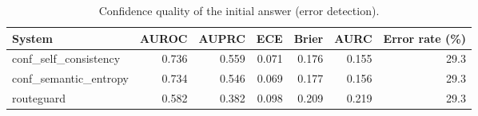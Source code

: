 \begin{table}[t]
\centering
\small
\caption{Confidence quality of the initial answer (error detection).}
\label{tab:calibration}
\begin{tabular}{lrrrrrr}
\toprule
System & AUROC & AUPRC & ECE & Brier & AURC & Error rate (\%) \\
\midrule
conf\_self\_consistency & 0.736 & 0.559 & 0.071 & 0.176 & 0.155 & 29.3 \\
conf\_semantic\_entropy & 0.734 & 0.546 & 0.069 & 0.177 & 0.156 & 29.3 \\
routeguard & 0.582 & 0.382 & 0.098 & 0.209 & 0.219 & 29.3 \\
\bottomrule
\end{tabular}
\end{table}
